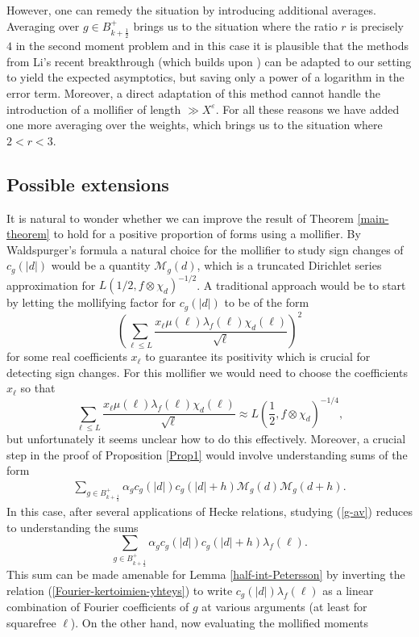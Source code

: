 \documentclass[a4paper,10pt,twoside]{amsart}
\theoremstyle{definition}
\numberwithin{equation}{section}
\newcommand\eps{\varepsilon}
\renewcommand\:{\colon}
\begin{document}
However, one can remedy the situation by introducing additional averages. Averaging over $g\in B_{k+\frac12}^+$ brings us to the situation where the ratio $r$ is precisely $4$ in the second moment problem and in this case it is plausible that the methods from Li's recent breakthrough \cite{Li2024} (which builds upon \cite{Soundararajan-Young2010}) can be adapted to our setting to yield the expected asymptotics, but saving only a power of a logarithm in the error term. Moreover, a direct adaptation of this method cannot handle the introduction of a mollifier of length $\gg X^\eps$. For all these reasons we have added one more averaging over the weights, which brings us to the situation where $2<r<3$. 

\subsection{Possible extensions} 
It is natural to wonder whether we can improve the result of Theorem \ref{main-theorem} to hold for a positive proportion of forms using a mollifier. By Waldspurger's formula a natural choice for the mollifier to study sign changes of $c_g(|d|)$ would be a quantity $\mathcal M_g(d)$, which is a truncated Dirichlet series approximation for $L(1/2,f\otimes\chi_d)^{-1/2}$. A traditional approach would be to start by letting the mollifying factor for $c_g(|d|)$ to be of the form
\[ 
\left(\sum_{\ell\leq L}\frac{x_\ell \mu(\ell)\lambda_f(\ell)\chi_d(\ell)}{\sqrt \ell}\right)^2\]
for some real coefficients $x_\ell$ to guarantee its positivity which is crucial for detecting sign changes. For this mollifier we would need to choose the coefficients $x_\ell$ so that
\[ 
\sum_{\ell\leq L}\frac{x_\ell \mu(\ell)\lambda_f(\ell)\chi_d(\ell)}{\sqrt \ell}\approx L\left(\frac12,f\otimes\chi_d\right)^{-1/4},\]
but unfortunately it seems unclear how to do this effectively. Moreover, a crucial step in the proof of Proposition \ref{Prop1} would involve understanding sums of the form
\begin{align}\label{g-av}
\sum_{g\in B_{k+\frac12}^+}\alpha_g c_g(|d|)c_g(|d|+h)\mathcal M_g(d)\mathcal M_g(d+h).
\end{align}
In this case, after several applications of Hecke relations, studying (\ref{g-av}) reduces to understanding the sums
\[ 
\sum_{g\in B_{k+\frac12}^+}\alpha_g c_g(|d|)c_g(|d|+h)\lambda_f(\ell).\]  This sum can be made amenable for Lemma \ref{half-int-Petersson} by inverting the relation (\ref{Fourier-kertoimien-yhteys}) to write $c_g(|d|)\lambda_f(\ell)$ as a linear combination of Fourier coefficients of $g$ at various arguments (at least for squarefree $\ell$). On the other hand, now evaluating the mollified moments 
\end{document}
